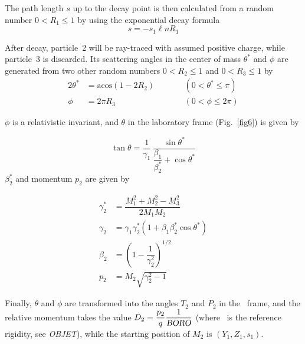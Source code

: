 \noindent The path length $ s $ up to the decay point is then calculated from
a random number $ 0<R_1\leq 1 $ by using the exponential decay formula
$$ s = - s_1 \ell n R_1 $$

\noindent After decay, particle~2  will  be ray-traced with assumed positive
charge, while particle~3 is discarded.  Its scattering angles in the center of mass 
$ \theta^\ast $ and $\phi$ are generated from two other random numbers 
$0<R_2\leq 1 $ and $ 0<R_3\leq 1 $ by
%
 \begin{alignat*}{2}
	 \theta^ \ast 
	       & =   \textrm{acos} (1 - 2R_2) & \qquad & (0   <\theta^\ast \leq \pi ) \\
	\phi 
	       & =   2\pi R_3         & \qquad &  (0<\phi \leq 2\pi ) 
 \end{alignat*}
%

\smallskip


\noindent $\phi$ is a relativistic invariant, and $\theta$ in the laboratory
frame (Fig.~\ref{fig6}) is given by    

$$ \tan \theta = \dfrac{1 }{ \gamma_1}\, 
    \dfrac{ \sin \theta^ \ast }{\dfrac{\beta_1 }{ \beta^ \ast_ 2}+ \cos \theta^\ast} 
    $$
%
  $ \beta^ \ast_ 2 $ and momentum $ p_2 $ are given by 

 \begin{align*}
	 \gamma^\ast_ 2 
	         & = \dfrac{M^2_1 + M^2_2 - M^2_3 }{ 2M_1M_2} \\
	\gamma_2
	         & =   \gamma_1\gamma^ \ast_ 2 
	         	\left(1+\beta_1 \beta^\ast_ 2 \cos \theta^ \ast \right) \\
	\beta_ 2 
	         & =  \left( 1- \dfrac{1 }{ \gamma^2_2} \right)^{1/2} \\
	p_2 
	         & = M_2 \sqrt{ \gamma^2_2 -1} 
 \end{align*}
 
\noindent Finally, $\theta$ and $\phi$ are transformed into the angles $ T_2 $
and $ P_2 $ in the \zgou\ frame, and the relative momentum takes the value 
$ D_2= \dfrac{p_2 }{ q} \dfrac{1}{\textsl{BORO}} $ (where \BORO\   
is the reference rigidity, see \textsl{OBJET}), while the starting position of 
$M_2 $ is $ (Y_1 , Z_1, s_1) $.   

